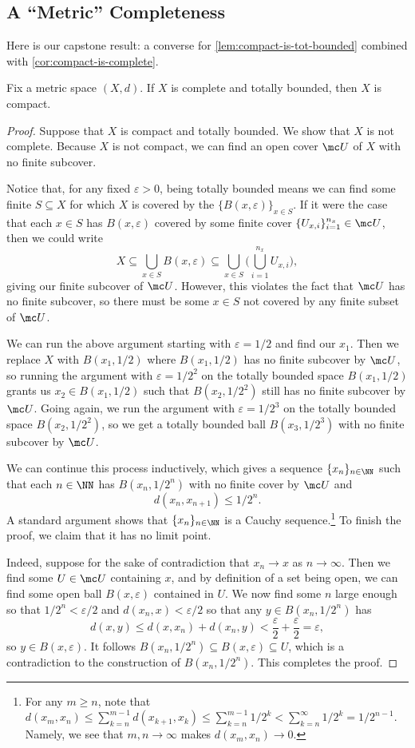 \documentclass[../notes.tex]{subfiles}
\begin{document}
\subsection{A ``Metric'' Completeness}
Here is our capstone result: a converse for \autoref{lem:compact-is-tot-bounded} combined with \autoref{cor:compact-is-complete}.
\begin{theorem} \label{thm:metric-compact}
	Fix a metric space $(X,d)$. If $X$ is complete and totally bounded, then $X$ is compact.
\end{theorem}
\begin{proof}
	Suppose that $X$ is compact and totally bounded. We show that $X$ is not complete. Because $X$ is not compact, we can find an open cover $\mc U$ of $X$ with no finite subcover.
	
	Notice that, for any fixed $\varepsilon>0$, being totally bounded means we can find some finite $S\subseteq X$ for which $X$ is covered by the $\{B(x,\varepsilon)\}_{x\in S}$. If it were the case that each $x\in S$ has $B(x,\varepsilon)$ covered by some finite cover $\{U_{x,i}\}_{i=1}^{n_x}\in\mc U$, then we could write
	\[X\subseteq\bigcup_{x\in S}B(x,\varepsilon)\subseteq\bigcup_{x\in S}\Bigg(\bigcup_{i=1}^{n_x}U_{x,i}\Bigg),\]
	giving our finite subcover of $\mc U$. However, this violates the fact that $\mc U$ has no finite subcover, so there must be some $x\in S$ not covered by any finite subset of $\mc U$.

	We can run the above argument starting with $\varepsilon=1/2$ and find our $x_1$. Then we replace $X$ with $B(x_1,1/2)$ where $B(x_1,1/2)$ has no finite subcover by $\mc U$, so running the argument with $\varepsilon=1/2^2$ on the totally bounded space $B(x_1,1/2)$ grants us $x_2\in B(x_1,1/2)$ such that $B(x_2,1/2^2)$ still has no finite subcover by $\mc U$. Going again, we run the argument with $\varepsilon=1/2^3$ on the totally bounded space $B(x_2,1/2^2)$, so we get a totally bounded ball $B(x_3,1/2^3)$ with no finite subcover by $\mc U$.
	
	We can continue this process inductively, which gives a sequence $\{x_n\}_{n\in\NN}$ such that each $n\in\NN$ has $B(x_n,1/2^n)$ with no finite cover by $\mc U$ and
	\[d(x_n,x_{n+1})\le 1/2^n.\]
	A standard argument shows that $\{x_n\}_{n\in\NN}$ is a Cauchy sequence.\footnote{For any $m\ge n$, note that $d(x_m,x_n)\le\sum_{k=n}^{m-1}d(x_{k+1},x_k)\le\sum_{k=n}^{m-1}1/2^k<\sum_{k=n}^\infty1/2^k=1/2^{n-1}$. Namely, we see that $m,n\to\infty$ makes $d(x_m,x_n)\to0$.} To finish the proof, we claim that it has no limit point.

	Indeed, suppose for the sake of contradiction that $x_n\to x$ as $n\to\infty$. Then we find some $U\in\mc U$ containing $x$, and by definition of a set being open, we can find some open ball $B(x,\varepsilon)$ contained in $U$. We now find some $n$ large enough so that $1/2^n<\varepsilon/2$ and $d(x_n,x)<\varepsilon/2$ so that any $y\in B(x_n,1/2^n)$ has
	\[d(x,y)\le d(x,x_n)+d(x_n,y)<\frac\varepsilon2+\frac\varepsilon2=\varepsilon,\]
	so $y\in B(x,\varepsilon)$. It follows $B(x_n,1/2^n)\subseteq B(x,\varepsilon)\subseteq U$, which is a contradiction to the construction of $B(x_n,1/2^n)$. This completes the proof.
\end{proof}
\end{document}
